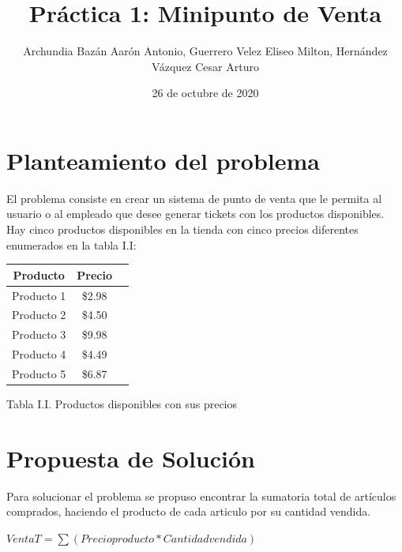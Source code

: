 \documentclass[letter,twocolumn]{revtex4}
\begin{document}
\title{Práctica 1: Minipunto de Venta}
\author{Archundia Bazán Aarón Antonio, Guerrero Velez Eliseo Milton, Hernández Vázquez Cesar Arturo}

\date{26 de octubre de 2020}
\maketitle


\section{Planteamiento del problema}


        El problema consiste en crear un sistema de punto de venta que le permita al usuario o al empleado que desee generar tickets con los productos disponibles. Hay cinco productos disponibles en la tienda con cinco precios diferentes enumerados en la tabla I.I:
\begin{center}
        \begin{tabular}{|c|c|c}
                \hline
                Producto  & Precio \\
                \hline
                Producto 1 & \$2.98 \\
                \hline
                Producto 2 & \$4.50 \\
                \hline
                Producto 3  & \$9.98 \\
                \hline
                Producto 4 & \$4.49  \\
                \hline
                Producto 5  & \$6.87 \\
                \hline
        
        \end{tabular}
\caption{Tabla I.I. Productos disponibles con sus precios }    
\end{center}
\section{Propuesta de Solución}
    Para solucionar el problema se propuso  encontrar la sumatoria total de artículos comprados,  haciendo el producto de cada articulo por su cantidad vendida.
    
                 \begin{center}
                        $VentaT = \sum (Precioproducto*Cantidadvendida)$
                 \end{center}  
        
\end{document}
